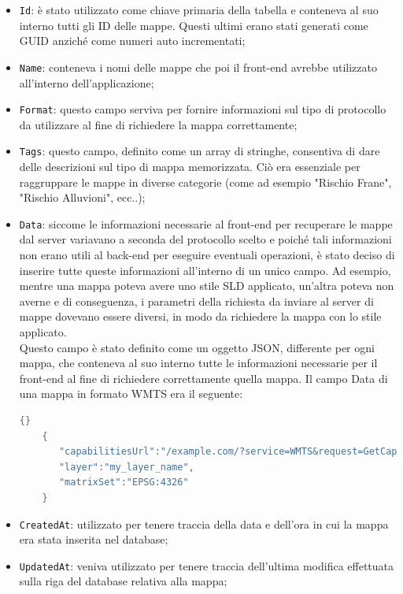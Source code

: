 \begin{itemize}
    \item \verb|Id|: è stato utilizzato come chiave primaria della tabella e conteneva al suo interno tutti gli ID delle mappe. Questi ultimi erano stati generati come GUID anziché come numeri auto incrementati;
    \item \verb|Name|: conteneva i nomi delle mappe che poi il front-end avrebbe utilizzato all'interno dell'applicazione;
    \item \verb|Format|: questo campo serviva per fornire informazioni sul tipo di protocollo da utilizzare al fine di richiedere la mappa correttamente;
    \item \verb|Tags|: questo campo, definito come un array di stringhe, consentiva di dare delle descrizioni sul tipo di mappa memorizzata. Ciò era essenziale per raggruppare le mappe in diverse categorie (come ad esempio "Rischio Frane", "Rischio Alluvioni", ecc..);
    \item \verb|Data|: siccome le informazioni necessarie al front-end per recuperare le mappe dal server variavano a seconda del protocollo scelto e poiché tali informazioni non erano utili al back-end per eseguire eventuali operazioni, è stato deciso di inserire tutte queste informazioni all'interno di un unico campo. Ad esempio, mentre una mappa poteva avere uno stile SLD applicato, un'altra poteva non averne e di conseguenza, i parametri della richiesta da inviare al server di mappe dovevano essere diversi, in modo da richiedere la mappa con lo stile applicato.
    \\Questo campo è stato definito come un oggetto JSON, differente per ogni mappa, che conteneva al suo interno tutte le informazioni necessarie per il front-end al fine di richiedere correttamente quella mappa. Il campo Data di una mappa in formato WMTS era il seguente:
    \begin{lstlisting}[language=Java]{}
    {
       "capabilitiesUrl":"/example.com/?service=WMTS&request=GetCapabilities",
       "layer":"my_layer_name",
       "matrixSet":"EPSG:4326"
    }
    \end{lstlisting}
    \item \verb|CreatedAt|: utilizzato per tenere traccia della data e dell'ora in cui la mappa era stata inserita nel database;
    \item \verb|UpdatedAt|: veniva utilizzato per tenere traccia dell'ultima modifica effettuata sulla riga del database relativa alla mappa;
\end{itemize}

